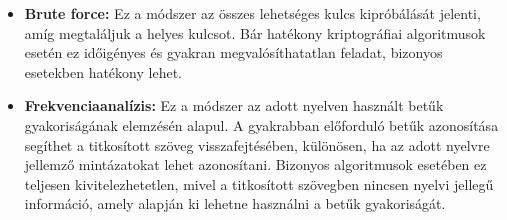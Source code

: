 \begin{itemize}
	\item\textbf{Brute force:} Ez a módszer az összes lehetséges kulcs kipróbálását jelenti, amíg megtaláljuk a helyes kulcsot. Bár hatékony kriptográfiai algoritmusok esetén ez időigényes és gyakran megvalósíthatatlan feladat, bizonyos esetekben hatékony lehet.

	\item\textbf{Frekvenciaanalízis:} Ez a módszer az adott nyelven használt betűk gyakoriságának elemzésén alapul. A gyakrabban előforduló betűk azonosítása segíthet a titkosított szöveg visszafejtésében, különösen, ha az adott nyelvre jellemző mintázatokat lehet azonosítani. Bizonyos algoritmusok esetében ez teljesen kivitelezhetetlen, mivel a titkosított szövegben nincsen nyelvi jellegű információ, amely alapján ki lehetne használni a betűk gyakoriságát.
\end{itemize}



































